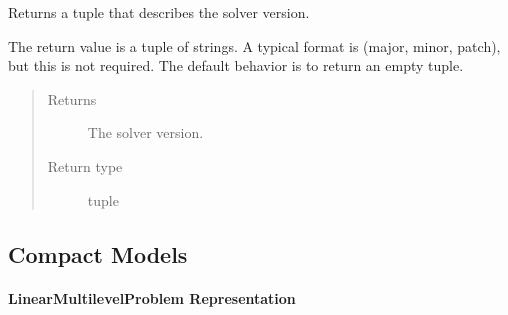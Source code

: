 \documentclass[letterpaper,10pt,english]{sphinxmanual}
\begin{document}
\begin{fulllineitems}

\begin{fulllineitems}
\label{\detokenize{reference/pyomo:pao.pyomo.solvers.mpr_solvers.PyomoSubmodelSolver_REG.version}}
Returns a tuple that describes the solver version.

The return value is a tuple of strings.  A typical format is (major, minor, patch), but this
is not required. The default behavior is to return an empty tuple.
\begin{quote}\begin{description}
\item[{Returns}] \leavevmode
The solver version.

\item[{Return type}] \leavevmode
tuple

\end{description}\end{quote}

\end{fulllineitems}


\end{fulllineitems}



\subsection{Compact Models}
\label{\detokenize{reference/mpr:compact-models}}\label{\detokenize{reference/mpr::doc}}

\paragraph{LinearMultilevelProblem Representation}
\label{\detokenize{reference/mpr:linearmultilevelproblem-representation}}
\end{document}
